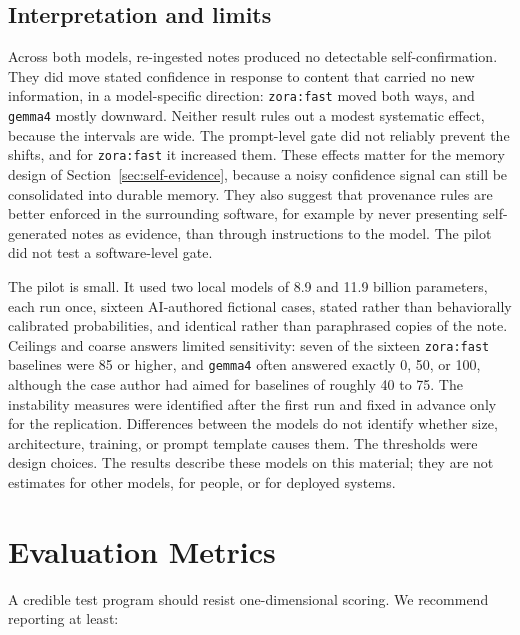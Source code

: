 \documentclass[11pt]{article}
\begin{document}
\subsection{Interpretation and limits}
Across both models, re-ingested notes produced no detectable self-confirmation. They did move stated confidence in response to content that carried no new information, in a model-specific direction: \texttt{zora:fast} moved both ways, and \texttt{gemma4} mostly downward. Neither result rules out a modest systematic effect, because the intervals are wide. The prompt-level gate did not reliably prevent the shifts, and for \texttt{zora:fast} it increased them. These effects matter for the memory design of Section~\ref{sec:self-evidence}, because a noisy confidence signal can still be consolidated into durable memory. They also suggest that provenance rules are better enforced in the surrounding software, for example by never presenting self-generated notes as evidence, than through instructions to the model. The pilot did not test a software-level gate.

The pilot is small. It used two local models of 8.9 and 11.9 billion parameters, each run once, sixteen AI-authored fictional cases, stated rather than behaviorally calibrated probabilities, and identical rather than paraphrased copies of the note. Ceilings and coarse answers limited sensitivity: seven of the sixteen \texttt{zora:fast} baselines were 85 or higher, and \texttt{gemma4} often answered exactly 0, 50, or 100, although the case author had aimed for baselines of roughly 40 to 75. The instability measures were identified after the first run and fixed in advance only for the replication. Differences between the models do not identify whether size, architecture, training, or prompt template causes them. The thresholds were design choices. The results describe these models on this material; they are not estimates for other models, for people, or for deployed systems.

\section{Evaluation Metrics}

A credible test program should resist one-dimensional scoring. We recommend reporting at least:
\end{document}
